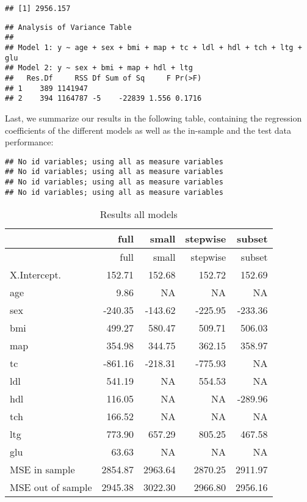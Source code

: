 \documentclass[
]{article}
\begin{document}
\begin{verbatim}
## [1] 2956.157
\end{verbatim}

\begin{verbatim}
## Analysis of Variance Table
## 
## Model 1: y ~ age + sex + bmi + map + tc + ldl + hdl + tch + ltg + glu
## Model 2: y ~ sex + bmi + map + hdl + ltg
##   Res.Df     RSS Df Sum of Sq     F Pr(>F)
## 1    389 1141947                          
## 2    394 1164787 -5    -22839 1.556 0.1716
\end{verbatim}

Last, we summarize our results in the following table, containing the
regression coefficients of the different models as well as the in-sample
and the test data performance:

\begin{verbatim}
## No id variables; using all as measure variables
## No id variables; using all as measure variables
## No id variables; using all as measure variables
## No id variables; using all as measure variables
\end{verbatim}

\begin{longtable}[]{@{}lrrrr@{}}
\caption{Results all models}\tabularnewline
\toprule()
& full & small & stepwise & subset \\
\midrule()
\endfirsthead
\toprule()
& full & small & stepwise & subset \\
\midrule()
\endhead
X.Intercept. & 152.71 & 152.68 & 152.72 & 152.69 \\
age & 9.86 & NA & NA & NA \\
sex & -240.35 & -143.62 & -225.95 & -233.36 \\
bmi & 499.27 & 580.47 & 509.71 & 506.03 \\
map & 354.98 & 344.75 & 362.15 & 358.97 \\
tc & -861.16 & -218.31 & -775.93 & NA \\
ldl & 541.19 & NA & 554.53 & NA \\
hdl & 116.05 & NA & NA & -289.96 \\
tch & 166.52 & NA & NA & NA \\
ltg & 773.90 & 657.29 & 805.25 & 467.58 \\
glu & 63.63 & NA & NA & NA \\
MSE in sample & 2854.87 & 2963.64 & 2870.25 & 2911.97 \\
MSE out of sample & 2945.38 & 3022.30 & 2966.80 & 2956.16 \\
\bottomrule()
\end{longtable}
\end{document}
